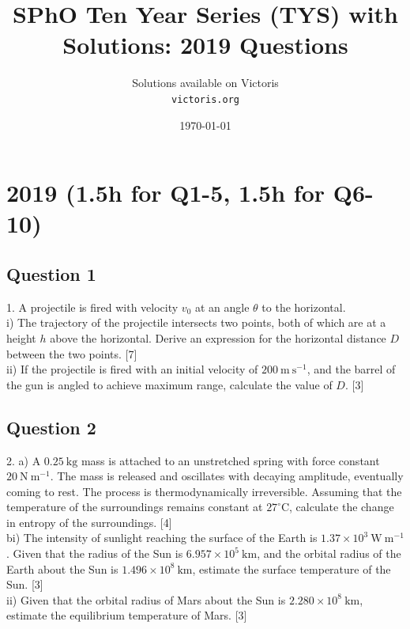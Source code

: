 \documentclass{article}
\title{SPhO Ten Year Series (TYS) with Solutions: 2019 Questions}
\author{
    Solutions available on Victoris\\
    \texttt{victoris.org}
}
\date{\today}
\begin{document}
\maketitle

\section{2019 (1.5h for Q1-5, 1.5h for Q6-10)}
\subsection{Question 1}
1. A projectile is fired with velocity $v_{0}$ at an angle $\theta$ to the horizontal. \\
i) The trajectory of the projectile intersects two points, both of which are at a height $h$ above the horizontal. Derive an expression for the horizontal distance $D$ between the two points. [7]  \\
ii) If the projectile is fired with an initial velocity of $200 \mathrm{~m} \mathrm{~s}^{-1}$, and the barrel of the gun is angled to achieve maximum range, calculate the value of $D$. [3]

\subsection{Question 2}
2. a) A $0.25 \mathrm{~kg}$ mass is attached to an unstretched spring with force constant $20 \mathrm{~N} \mathrm{~m}^{-1}$. The mass is released and oscillates with decaying amplitude, eventually coming to rest. The process is thermodynamically irreversible. Assuming that the temperature of the surroundings remains constant at $27^{\circ} \mathrm{C}$, calculate the change in entropy of the surroundings. [4] \\
bi) The intensity of sunlight reaching the surface of the Earth is $1.37 \times 10^{3} \mathrm{~W} \mathrm{~m}^{-1}$. Given that the radius of the Sun is $6.957 \times 10^{5} \mathrm{~km}$, and the orbital radius of the Earth about the Sun is $1.496 \times 10^{8} \mathrm{~km}$, estimate the surface temperature of the Sun. [3] \\
ii) Given that the orbital radius of Mars about the Sun is $2.280 \times 10^{8} \mathrm{~km}$, estimate the equilibrium temperature of Mars. [3]
\end{document}
